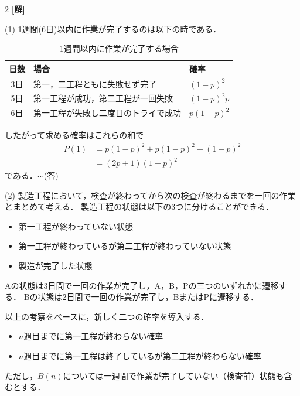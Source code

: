 \documentclass[../../../../main.tex]{subfiles}
\begin{document}
\setcounter{equation}{0}
\begin{oframed}
  
\end{oframed}
\setlength{\columnseprule}{0.4pt}
\begin{multicols}{2}
  {\bf[解]}

  (1)
  1週間(6日)以内に作業が完了するのは以下の時である．
  \begin{table}[H]
    \centering
    \caption{1週間以内に作業が完了する場合}
    \label{1994-3:table:1}
    \begin{tabular}{|c||l|l|} \hline
      日数 & 場合                 & 確率         \\ \hline\hline
      3日 & 第一，二工程ともに失敗せず完了    & $(1-p)^2$  \\ \hline
      5日 & 第一工程が成功，第二工程が一回失敗  & $(1-p)^2p$ \\ \hline
      6日 & 第一工程が失敗し二度目のトライで成功 & $p(1-p)^2$ \\ \hline
    \end{tabular}
  \end{table}

  したがって求める確率はこれらの和で
  \begin{align}
    P(1)
     & = p(1-p)^2 + p(1-p)^2 + (1-p)^2      \\
     & = (2p+1)(1-p)^2  \label{1994-3:eq:1}
  \end{align}
  である．$\cdots$(答)
  \vspace{10pt}

  (2)
  製造工程において，検査が終わってから次の検査が終わるまでを一回の作業とまとめて考える．
  製造工程の状態は以下の3つに分けることができる．
  \begin{itemize}
    \item[A] 第一工程が終わっていない状態
    \item[B] 第一工程が終わっているが第二工程が終わっていない状態
    \item[P] 製造が完了した状態
  \end{itemize}
  Aの状態は3日間で一回の作業が完了し，A，B，Pの三つのいずれかに遷移する．
  Bの状態は2日間で一回の作業が完了し，BまたはPに遷移する．

  以上の考察をベースに，新しく二つの確率を導入する．
  \begin{itemize}
    \item[$A(n)$] $n$週目までに第一工程が終わらない確率 \\
    \item[$B(n)$] $n$週目までに第一工程は終了しているが第二工程が終わらない確率
  \end{itemize}
  ただし，$B(n)$については一週間で作業が完了していない（検査前）状態も含むとする．


\end{multicols}
\end{document}
